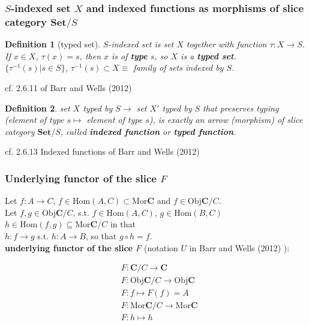 \documentclass[10pt]{amsart}
\newtheorem{definition}{Definition}
\begin{document}
\begin{multicols*}{2}
\subsubsection{$S$-indexed set $X$ and indexed functions as morphisms of slice category $\mathbf{Set}/S$}

\begin{definition}[typed set]
	$S$-indexed set is set $X$ together with function $\tau : X \to S$. \\
	
	If $x\in X$, $\tau(x) = s$, then $x$ is of \textbf{type} $s$, so $X$ is a \textbf{typed set}. \\
	
	$\lbrace \tau^{-1}(s) | s \in S \rbrace$, $\tau^{-1}(s) \subset X \equiv $ family of sets indexed by $S$. \\
	
\end{definition} 
cf. 2.6.11 of Barr and Wells (2012) \cite{BaWe2012}

\begin{definition}
	set $X$ typed by $S \to $ set $X'$ typed by $S$ that preserves typing (element of type $s\mapsto $ element of type $s$), is exactly an arrow (morphism) of slice category $\mathbf{Set}/S$, called \textbf{indexed function} or \textbf{typed function}.
\end{definition}

cf. 2.6.13 Indexed functions of Barr and Wells (2012) \cite{BaWe2012}

\subsubsection{Underlying functor of the slice $F$}

Let $f: A\to C$, $f\in \text{Hom}(A,C) \subset \text{Mor}\mathbf{C}$ and $f\in \text{Obj}\mathbf{C}/C$.  \\

Let $f,g \in \text{Obj}\mathbf{C}/C$, s.t. $f\in \text{Hom}(A,C)$, $g\in \text{Hom}(B,C)$ \\
$h\in \text{Hom}(f,g) \subseteq \text{Mor}\mathbf{C}/C$ in that \\
$h : f\to g$ s.t. $h:A \to B$, so that $g\circ h = f$. \\

\textbf{underlying functor of the slice $F$} (notation $U$ in Barr and Wells (2012) \cite{BaWe2012}):

\begin{equation}
\begin{aligned}
& F: \mathbf{C} /C \to \mathbf{C} \\ 
& F:\text{Obj}\mathbf{C}/C \to \text{Obj}\mathbf{C} \\ 
& F:f\mapsto F(f) = A \\ 
& F:\text{Mor}\mathbf{C}/C \to \text{Mor}\mathbf{C} \\ 
& F: h \mapsto h 
\end{aligned} 
\end{equation}


\end{multicols*}
\end{document}
